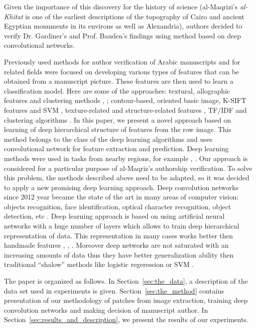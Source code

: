 \documentclass[conference,a4paper]{ieeetran}
\begin{document}
Given the importance of this discovery for the history of science (al-Maqrizi's \textit{al-Khitat} is one of the earliest descriptions of the topography of Cairo and ancient Egyptian monuments in its environs as well as Alexandria), authors decided to verify Dr. Gardiner's and Prof. Bauden's findings using method based on deep convolutional networks.

Previously used methods for author verification of Arabic manuscripts and for related fields were focused on developing various types of features that can be obtained from a manuscript picture. These features are then used to learn a classification model. Here are some of the approaches: textural, allographic features and clustering methods \cite{MBulacu}, \cite{MBulacu1}; contour-based, oriented basic image, K-SIFT features and SVM \cite{DFecker}, texture-related and structure-related features \cite{Salvador}, TF/IDF and clustering algorithms \cite{Dunn}. In this paper, we present a novel approach based on learning of deep hierarchical structure of features from the row image. This method belongs to the class of the deep learning algorithms \cite{DL} and uses convolutional network \cite{CNN} for feature extraction and prediction. {\color{red} Deep learning methods were used in tasks from nearby regions, for example \cite{DL_Arabic_1}, \cite{DL_Arabic_2}. Our approach is considered for a particular purpose of al-Maqriz's authorship verification. To solve this problem, the methods described above need to be adapted, so it was decided to apply a new promising deep learning approach.} Deep convolution networks since 2012 year \cite{Alexnet} became the state of the art in many areas of computer vision: objects recognition, face identification, optical character recognition, object detection, etc \cite{DL}. Deep learning approach is based on using artificial neural networks with a huge number of layers which allows to train deep hierarchical representation of data. This representation in many cases works better then handmade features \cite{DL}, \cite{Alexnet}, \cite{Googlenet}. Moreover deep networks are not saturated with an increasing amounts of data thus they have better generalization ability then traditional ``shalow'' methods like logistic regeression or SVM \cite{DL}.   

The paper is organized as follows. In Section~\ref{sec:the_data}, a description of the data set used in experiments is given. Section~\ref{sec:the_method} contains presentation of our methodology of patches from image extraction, training deep convolution networks and making decision of manuscript author. In Section~\ref{sec:results_and_description}, we present the results of our experiments.
	
\end{document}

